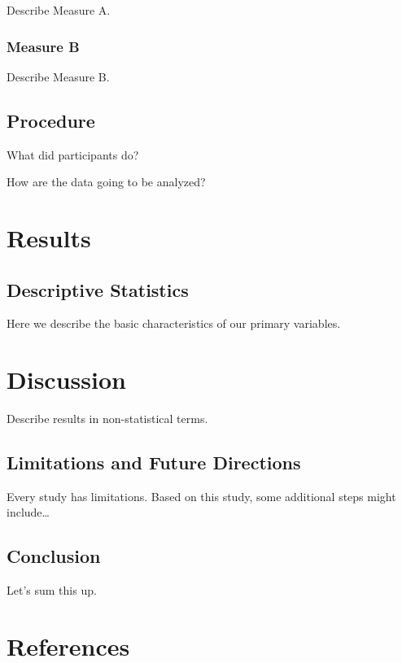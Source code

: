 \documentclass[
  man,
  longtable,
  nolmodern,
  notxfonts,
  notimes,
  colorlinks=true,linkcolor=blue,citecolor=blue,urlcolor=blue]{apa7}
\begin{document}
Describe Measure A.

\subsubsection{Measure B}\label{measure-b}

Describe Measure B.

\subsection{Procedure}\label{procedure}

What did participants do?

How are the data going to be analyzed?

\section{Results}\label{results}

\subsection{Descriptive Statistics}\label{descriptive-statistics}

Here we describe the basic characteristics of our primary variables.

\section{Discussion}\label{discussion}

Describe results in non-statistical terms.

\subsection{Limitations and Future
Directions}\label{limitations-and-future-directions}

Every study has limitations. Based on this study, some additional steps
might include\ldots{}

\subsection{Conclusion}\label{conclusion}

Let's sum this up.

\section{References}\label{references}
\end{document}
